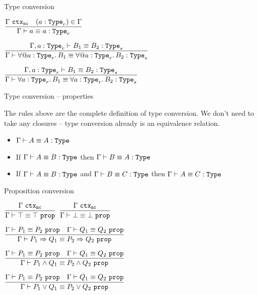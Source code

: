 \begin{frame}{Type conversion}

\begin{center}
  $\infrule{\ctx[\noncomputable]{\Gamma} \quad (a : \Type[r]) \in \Gamma}{\typeconv{a}{a}[r]}$

  \vspace{2em}

  $\infrule{\typeconv[\extendtype{\Gamma}{a}[r]]{B_1}{B_2}[s]}{\typeconv{\ForallE{a}[r]{B_1}}{\ForallE{a}[r]{B_2}}[s]}$

  \vspace{2em}

  $\infrule{\typeconv[\extendtype{\Gamma}{a}[r]]{B_1}{B_2}[s]}{\typeconv{\ForallI{a}[r]{B_1}}{\ForallI{a}[r]{B_2}}[s]}$
\end{center}

\end{frame}

\begin{frame}{Type conversion -- properties}

The rules above are the complete definition of type conversion. We don't need to take any closures -- type conversion already is an equivalence relation.

\begin{itemize}
  \item $\typeconv{A}{A}$
  \item If $\typeconv{A}{B}$ then $\typeconv{B}{A}$
  \item If $\typeconv{A}{B}$ and $\typeconv{B}{C}$ then $\typeconv{A}{C}$
\end{itemize}

\end{frame}

\begin{frame}{Proposition conversion}

\begin{center}
  $\infrule{\ctx[\noncomputable]{\Gamma}}{\propconv{\True}{\True}}$ \quad
  $\infrule{\ctx[\noncomputable]{\Gamma}}{\propconv{\False}{\False}}$

  \vspace{2em}

  $\infrule{\propconv{P_1}{P_2} \quad \propconv{Q_1}{Q_2}}{\propconv{\Impl{P_1}{Q_1}}{\Impl{P_2}{Q_2}}}$

  \vspace{2em}

  $\infrule{\propconv{P_1}{P_2} \quad \propconv{Q_1}{Q_2}}{\propconv{\And{P_1}{Q_1}}{\And{P_2}{Q_2}}}$

  \vspace{2em}

  $\infrule{\propconv{P_1}{P_2} \quad \propconv{Q_1}{Q_2}}{\propconv{\Or{P_1}{Q_1}}{\Or{P_2}{Q_2}}}$
\end{center}

\end{frame}

